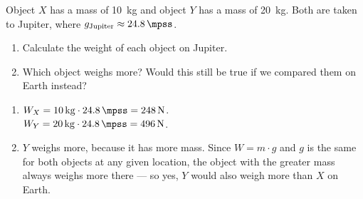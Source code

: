 \begin{exercise}
    Object \(X\) has a mass of \qty{10}{\kg} and object \(Y\) has a mass of \qty{20}{\kg}. Both are taken to Jupiter, where \(g_{\text{Jupiter}} \approx \qty{24.8}{\mpss}\).
    \begin{enumerate}[label=\letraminuscula]
        \item Calculate the weight of each object on Jupiter.
        \item Which object weighs more? Would this still be true if we compared them on Earth instead?
    \end{enumerate}
    \begin{solu}
        \begin{enumerate}[label=\alph*)]
            \item \(W_X = \qty{10}{\kg} \cdot \qty{24.8}{\mpss} = \qty{248}{\newton}\). \\
            \(W_Y = \qty{20}{\kg} \cdot \qty{24.8}{\mpss} = \qty{496}{\newton}\).
            \item \(Y\) weighs more, because it has more mass. Since \(W = m \cdot g\) and \(g\) is the same for both objects at any given location, the object with the greater mass always weighs more there — so yes, \(Y\) would also weigh more than \(X\) on Earth.
        \end{enumerate}
    \end{solu}
\end{exercise}

